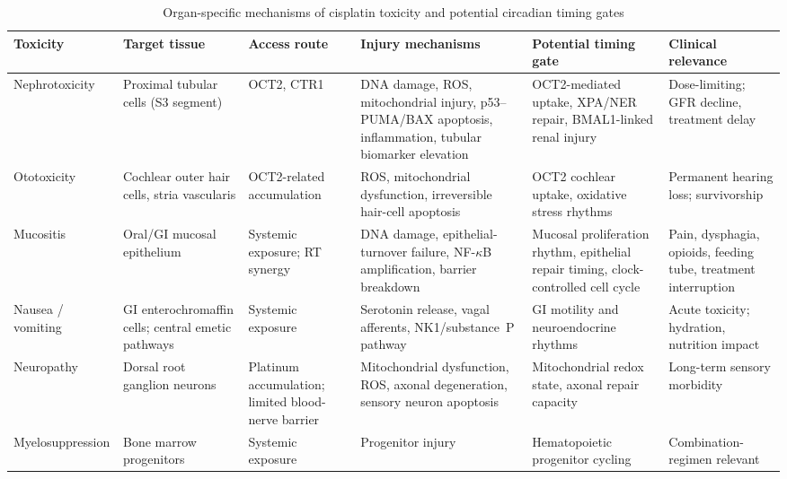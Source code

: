 \documentclass[preprint,review,12pt]{elsarticle}
\begin{document}
\begin{table}
\centering
\caption{Organ-specific mechanisms of cisplatin toxicity and potential circadian
  timing gates}
\label{tab:toxicity}
\small
\begin{tabularx}{\linewidth}{L{3.2cm} L{2.9cm} L{2.5cm} Y Y Y}
\toprule
\textbf{Toxicity} & \textbf{Target tissue} & \textbf{Access route} &
  \textbf{Injury mechanisms} & \textbf{Potential timing gate} &
  \textbf{Clinical relevance} \\
\midrule
Nephrotoxicity &
  Proximal tubular cells (S3 segment) &
  OCT2, CTR1 &
  DNA damage, ROS, mitochondrial injury, p53--PUMA/BAX apoptosis,
  inflammation, tubular biomarker elevation &
  OCT2-mediated uptake, XPA/NER repair, BMAL1-linked renal injury &
  Dose-limiting; GFR decline, treatment delay \\
\addlinespace
Ototoxicity &
  Cochlear outer hair cells, stria vascularis &
  OCT2-related accumulation &
  ROS, mitochondrial dysfunction, irreversible hair-cell apoptosis &
  OCT2 cochlear uptake, oxidative stress rhythms &
  Permanent hearing loss; survivorship \\
\addlinespace
Mucositis &
  Oral/GI mucosal epithelium &
  Systemic exposure; RT synergy &
  DNA damage, epithelial-turnover failure, NF-$\kappa$B amplification,
  barrier breakdown &
  Mucosal proliferation rhythm, epithelial repair timing,
  clock-controlled cell cycle &
  Pain, dysphagia, opioids, feeding tube, treatment interruption \\
\addlinespace
Nausea / vomiting &
  GI enterochromaffin cells; central emetic pathways &
  Systemic exposure &
  Serotonin release, vagal afferents, NK1/substance~P pathway &
  GI motility and neuroendocrine rhythms &
  Acute toxicity; hydration, nutrition impact \\
\addlinespace
Neuropathy &
  Dorsal root ganglion neurons &
  Platinum accumulation; limited blood-nerve barrier &
  Mitochondrial dysfunction, ROS, axonal degeneration,
  sensory neuron apoptosis &
  Mitochondrial redox state, axonal repair capacity &
  Long-term sensory morbidity \\
\addlinespace
Myelosuppression &
  Bone marrow progenitors &
  Systemic exposure &
  Progenitor injury &
  Hematopoietic progenitor cycling &
  Combination-regimen relevant \\
\bottomrule
\end{tabularx}
\end{table}
\end{document}
